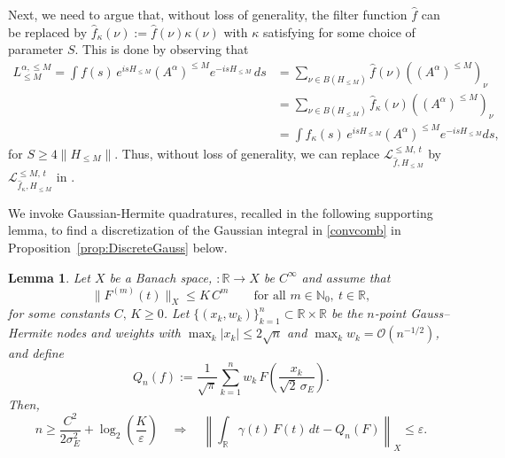 \documentclass[11pt]{amsart}
\newcommand{\nn}{\nonumber}
\newcommand{\1}{\mathbbm{1}}
\newcommand{\R}{\mathbb{R}}
\theoremstyle{plain}
\newtheorem{lemma}[theorem]{Lemma}
\theoremstyle{definition}
\theoremstyle{remark}
\numberwithin{equation}{section}
\begin{document}
Next, we need to argue that, without loss of generality, the filter function $\widehat{f}$ can be replaced by  $\widehat{f}_{\kappa}(\nu):=\widehat{f}(\nu)\kappa(\nu)$ with $\kappa$ satisfying  for some choice of parameter $S$. This is done by observing that
\begin{align}
\label{eq:LMkappaVsNoKappa}
\nn L_{\le M}^{\alpha,\le M}=\int f(s)\,e^{isH_{\le M}}(A^{\alpha})^{\le M}e^{-isH_{\le M}}\,ds&=\sum_{\nu\in B(H_{\le M})}\widehat{f}(\nu) ((A^{\alpha})^{\le M})_{\nu}\\\nn
&=\sum_{\nu\in B(H_{\le M})}\widehat{f}_\kappa(\nu) ((A^{\alpha})^{\le M})_{\nu}\\
&=\int f_\kappa(s)\,e^{is H_{\le M}}(A^{\alpha})^{\le M}e^{-is H_{\le M}} ds,
\end{align}
for $S\ge 4\|H_{\le M}\|$. Thus, without loss of generality, we can replace $\mathcal{L}_{\widehat{f},H_{\le M}}^{\le M,\,t}$ by $\mathcal{L}_{\widehat{f}_\kappa,H_{\le M}}^{\le M,\,t}$ in .

We invoke Gaussian-Hermite quadratures, recalled in the following supporting lemma, to find a discretization of the Gaussian integral in \eqref{convcomb} in Proposition~\ref{prop:DiscreteGauss} below.




\begin{lemma}
\label{lem:GaussHermite}
Let $X$ be a Banach space, $:\mathbb R\to X$ be $C^\infty$ and assume that
\[
\|F^{(m)}(t)\|_X \le K\,C^m
\qquad
\text{for all }m\in\mathbb N_0,\ t\in\mathbb R,
\]
for some constants $C,\,K\ge 0$. Let $\{(x_k,w_k)\}_{k=1}^n \subset \R\times \R$ be the $n$-point Gauss--Hermite nodes and weights with $\max_k|x_k|\le 2\sqrt{n}$ and $\max_k w_k=\mathcal{O}(n^{-1/2})$, and define
\[
Q_n(f)
:=
\frac{1}{\sqrt{\pi}}
\sum_{k=1}^n
w_k\,F\!\left(\frac{x_k}{\sqrt2\,\sigma_E}\right).
\]
Then, 
\[
n \ge \frac{C^2}{2\sigma_E^2} + \log_2\!\left(\frac{K}{\varepsilon}\right)\quad \Rightarrow\quad 
\left\|
\int_{\mathbb R} \gamma(t)\,F(t)\,dt
-
Q_n(F)
\right\|_X
\le \varepsilon.
\]
\end{lemma}
\end{document}
